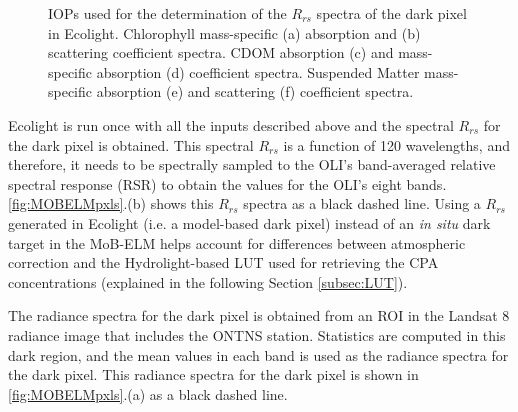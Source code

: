 \documentclass[onecolumn,3p,letterpaper,11pt]{elsarticle}
\begin{document}
\begin{figure}[htb!]
    \caption{IOPs used for the determination of the $R_{rs}$ spectra of the dark pixel in Ecolight. Chlorophyll mass-specific (a) absorption and (b) scattering coefficient spectra. CDOM absorption (c) and mass-specific absorption (d) coefficient spectra. Suspended Matter mass-specific absorption (e) and scattering (f) coefficient spectra.  \label{fig:IOPs} } 
\end{figure}

Ecolight is run once with all the inputs described above and the spectral $R_{rs}$ for the dark pixel is obtained. This spectral $R_{rs}$ is a function of 120 wavelengths, and therefore, it needs to be spectrally sampled to the OLI's band-averaged relative spectral response (RSR) to obtain the values for the OLI's eight bands. \autoref{fig:MOBELMpxls}.(b) shows this $R_{rs}$ spectra as a black dashed line. Using a $R_{rs}$ generated in Ecolight (i.e. a model-based dark pixel) instead of an {\it in situ} dark target in the MoB-ELM helps account for differences between atmospheric correction and the Hydrolight-based LUT used for retrieving the CPA concentrations (explained in the following Section \ref{subsec:LUT}).

The radiance spectra for the dark pixel is obtained from an ROI in the Landsat 8 radiance image that includes the ONTNS station. Statistics are computed in this dark region, and the mean values in each band is used as the radiance spectra for the dark pixel. This radiance spectra for the dark pixel is shown in \autoref{fig:MOBELMpxls}.(a) as a black dashed line.
\end{document}
